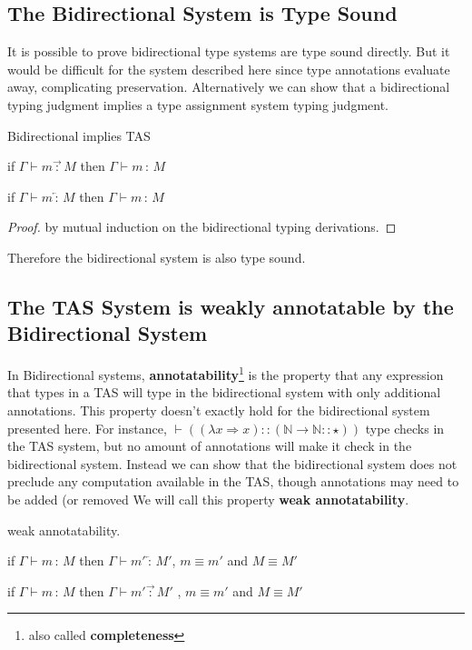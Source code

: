 \subsection{The Bidirectional System is Type Sound}

It is possible to prove bidirectional type systems are type sound directly\cite{nanevski2005dependent}.
But it would be difficult for the system described here since type annotations evaluate away, complicating preservation.
Alternatively we can show that a bidirectional typing judgment implies a type assignment system typing judgment.

\begin{thm}
Bidirectional implies TAS

if $\Gamma\vdash m\overrightarrow{\,:\,}M$ then $\Gamma\vdash m\,:\,M$

if $\Gamma\vdash m\overleftarrow{\,:\,}M$ then $\Gamma\vdash m\,:\,M$
\end{thm}

\begin{proof}
by mutual induction on the bidirectional typing derivations.
\end{proof}
Therefore the bidirectional system is also type sound.

\subsection{The TAS System is weakly annotatable by the Bidirectional System}

In Bidirectional systems, \textbf{annotatability}\footnote{also called \textbf{completeness}} is the property that any expression that types in a TAS will type in the bidirectional system with only additional annotations.
This property doesn't exactly hold for the bidirectional system presented here.
For instance, $\vdash\left((\lambda x\Rightarrow x)::\left(\mathbb{N}\rightarrow\mathbb{N}::\star\right)\right)$ type checks in the TAS system, but no amount of annotations will make it check in the bidirectional system.
Instead we can show that the bidirectional system does not preclude any computation available in the TAS, though annotations may need to be added (or removed%
We will call this property \textbf{weak annotatability}.
\begin{thm}
weak annotatability.

if $\Gamma\vdash m\,:\,M$ then $\Gamma\vdash m'\overleftarrow{\,:\,}M'$, $m\equiv m'$ and $M\equiv M'$ 

if $\Gamma\vdash m\,:\,M$ then $\Gamma\vdash m'\overrightarrow{\,:\,}M'$ , $m\equiv m'$ and $M\equiv M'$
\end{thm}

